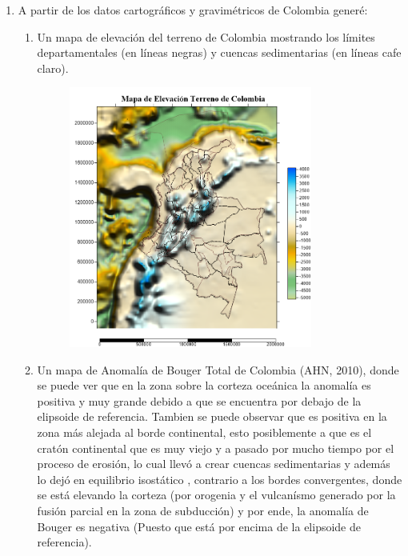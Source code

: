 \documentclass{article}
\begin{document}
\begin{enumerate}
\begin{enumerate}
\begin{figure}[H]
	\end{figure}
	\end{enumerate}
En primer lugar se puede ver que el mapa de contornos de la anomal\'ia de Aire Libre se asemeja mucho al mapa de elevaci\'on de terreno debido a que esta anomal\'ia solo tiene en cuenta el cambio de la gravedad con respecto a la altura al elipsoide de referencia. Con respecto al mapa de contornos de la anomal\'ia de Bouger, podemos observar lo que dif\'icilmente se pod\'ia distinguir en el mapa de elevaci\'on de terreno. Como la anomal\'ia de Bouger quita la contribuci\'on del material entre la elipsoide de referencia y la estaci\'on, demarca muy bien los puntos en los cuales la estaci\'on se encuentra a una altura mucho m\'as elevada que el resto del terreno. Es as\'i como se ven claramente un par de picos en donde la correcci\'on fue mucho mayor (verde) y tambi\'en unas zonas donde la correcci\'on fue m\'inima (en azul).
\item A partir de los datos cartogr\'aficos y gravim\'etricos de Colombia gener\'e:
	\begin{enumerate}
	\item Un mapa de elevaci\'on del terreno de Colombia mostrando los l\'imites departamentales (en l\'ineas negras) y cuencas sedimentarias (en l\'ineas cafe claro).
	\begin{figure}[H]\centering
	\includegraphics[width=8cm]{TColombia.png}
	\end{figure}
	\item Un mapa de Anomal\'ia de Bouger Total de Colombia (AHN, 2010), donde se puede ver que en la zona sobre la corteza oce\'anica la anomal\'ia es positiva y muy grande debido a que se encuentra por debajo de la elipsoide de referencia. Tambien se puede observar que es positiva en la zona m\'as alejada al borde continental, esto posiblemente a que es el crat\'on continental que es muy viejo y a pasado por mucho tiempo por el proceso de erosi\'on, lo cual llev\'o a crear cuencas sedimentarias y adem\'as lo dej\'o en equilibrio isost\'atico , contrario a los bordes convergentes, donde se est\'a elevando la corteza (por orogenia y el vulcan\'ismo generado por la fusi\'on parcial en la zona de subducci\'on) y por ende, la anomal\'ia de Bouger es negativa (Puesto que est\'a por encima de la elipsoide de referencia).

\end{enumerate}
\end{enumerate}
\end{document}
